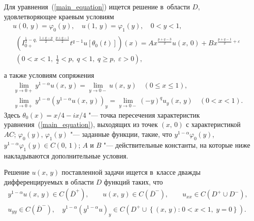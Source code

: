 Для уравнения~(\ref{main_equation}) ищется решение в~области $D$, удовлетворяющее краевым условиям
\begin{gather}\label{boundary_condition_1}
  u(0,\,y)=\varphi_0(y), \quad u(1,\,y)=\varphi_1(y), \quad 0<y<1,
\\
\label{boundary_condition_2}
    \begin{array}{c}
    \displaystyle
      \left(I_{0+}^{\frac{1}{2}-q,\:\frac{1+q-p}{2},\frac{p+q-1}{2}}t^{q-1}u\left[\theta_0(t)\right]\right)(x)=Ax^{\frac{p+q-3}{2}}u(x,\,0)+Bx^{\frac{p+q-1}{2}+\varepsilon}\\
    \left(0<x<1,\;\frac{1}{2}<p,\;q<1,\;q\geqslant p,\;\varepsilon>0\right),\\
    \end{array}
\end{gather}
а также условиям сопряжения
\begin{gather}\label{connection_1}
  \lim\limits_{y\rightarrow0+}y^{1-\alpha}u(x,\,y)=\lim\limits_{y\rightarrow0-}u(x,\,y)\quad (0\leqslant x\leqslant1),
\\
\label{connection_2}
  \lim\limits_{y\rightarrow0+}y^{1-\alpha}\left(y^{1-\alpha}u(x,\,y)\right)_y=\lim\limits_{y\rightarrow0-}(-y)^{q}u_y(x,\,y)\quad (0<x<1).
\end{gather}
Здесь $\theta_0(x)={x}/{4}-i{x}/{4}$ "--- точка пересечения характеристик уравнения~(\ref{main_equation}), выходящих из точек $(x,\,0)$ с характеристикой $AC$; $\varphi_0(y)$, $\varphi_1(y)$ "--- заданные функции, такие, что 
  $y^{1-\alpha}\varphi_0(y)$, $ y^{1-\alpha}\varphi_1(y)\in C(0,\,1)$;
$A$ и $B$ "--- действительные константы, на которые ниже накладываются дополнительные условия.

Решение $u(x,\,y)$ поставленной задачи ищется в~классе дважды дифференцируемых в области $D$ функций таких, что
\begin{equation}\label{u''}
\begin{array}{c}
  y^{1-\alpha}u(x,\,y)\in C(\overline{D}^+),\qquad u(x,\,y)\in C(\overline{D}^-), \qquad 
  u_{xx}\in C\left(D^+\cup D^-\right),\\ u_{yy}\in C(\overline{D}^-), \quad 
  y^{1-\alpha}\left(y^{1-\alpha}u\right)_y \in C\left(D^+\cup \left\{(x,\,y)\textrm{:}\;0<x<1,\;y=0\right\}\right).
\end{array}
\end{equation}

\smallskip

